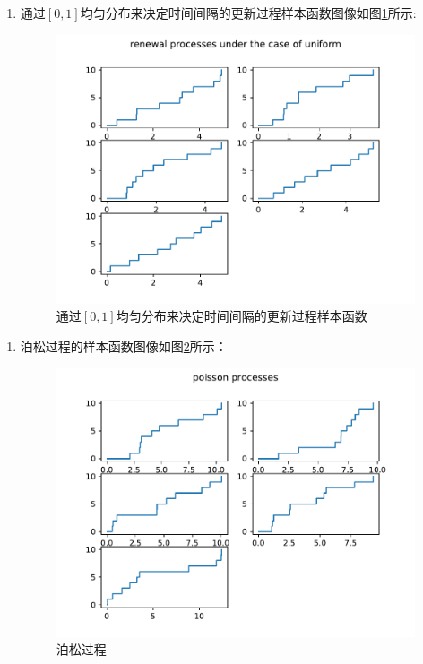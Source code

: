 \documentclass{article}
\begin{document}
    \clearpage
    \begin{enumerate}[2)]
        \item 通过$[0,1]$均匀分布来决定时间间隔的更新过程样本函数图像如图\ref{fig:uniform}所示:

            \begin{figure}[h]
                \centering
                \includegraphics[width=6.0in]{uniform.pdf}
                \caption{通过$[0,1]$均匀分布来决定时间间隔的更新过程样本函数}
                \label{fig:uniform}
            \end{figure}
    \end{enumerate}
    \clearpage
    \begin{enumerate}[3)]
        \item 泊松过程的样本函数图像如图\ref{fig:poisson}所示：
            \begin{figure}[h]
                \centering
                \includegraphics[width=6.0in]{poisson.pdf}
                \caption{泊松过程}
                \label{fig:poisson}
            \end{figure}
    \end{enumerate}
\end{document}
